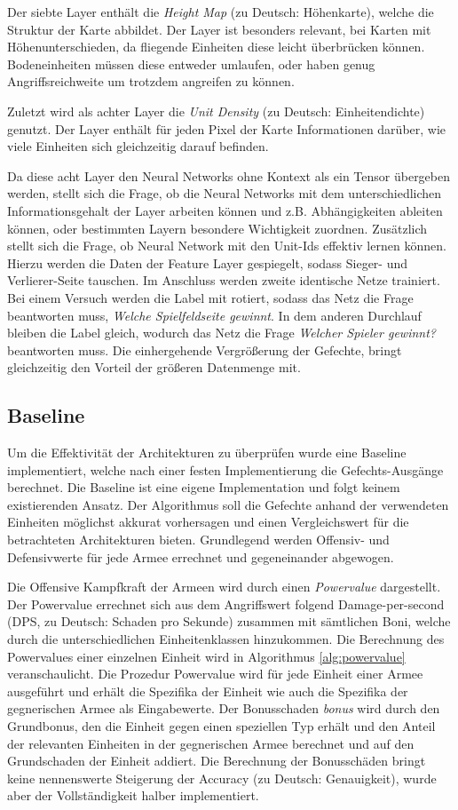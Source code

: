 Der siebte Layer enthält die \textit{Height Map} (zu Deutsch: Höhenkarte), welche die Struktur der Karte abbildet. Der Layer ist besonders relevant, bei Karten mit Höhenunterschieden, da fliegende Einheiten diese leicht überbrücken können. Bodeneinheiten müssen diese entweder umlaufen, oder haben genug Angriffsreichweite um trotzdem angreifen zu können. 

Zuletzt wird als achter Layer die \textit{Unit Density} (zu Deutsch: Einheitendichte) genutzt. Der Layer enthält für jeden Pixel der Karte Informationen darüber, wie viele Einheiten sich gleichzeitig darauf befinden. 

Da diese acht Layer den Neural Networks ohne Kontext als ein Tensor übergeben werden, stellt sich die Frage, ob die Neural Networks mit dem unterschiedlichen Informationsgehalt der Layer arbeiten können und z.B. Abhängigkeiten ableiten können, oder bestimmten Layern besondere Wichtigkeit zuordnen. Zusätzlich stellt sich die Frage, ob  Neural Network mit den Unit-Ids effektiv lernen können. Hierzu werden die Daten der Feature Layer gespiegelt, sodass Sieger- und Verlierer-Seite tauschen. Im Anschluss werden zweite identische Netze trainiert. Bei einem Versuch werden die Label mit rotiert, sodass das Netz die Frage beantworten muss, \textit{Welche Spielfeldseite gewinnt}. In dem anderen Durchlauf bleiben die Label gleich, wodurch das Netz die Frage \textit{Welcher Spieler gewinnt?} beantworten muss. Die einhergehende Vergrößerung der Gefechte, bringt gleichzeitig den Vorteil der größeren Datenmenge mit.


\subsection{Baseline}
Um die Effektivität der Architekturen zu überprüfen wurde eine Baseline implementiert, welche nach einer festen Implementierung die Gefechts-Ausgänge berechnet. Die Baseline ist eine eigene Implementation und folgt keinem existierenden Ansatz. Der Algorithmus soll die Gefechte anhand der verwendeten Einheiten möglichst akkurat vorhersagen und einen Vergleichswert für die betrachteten Architekturen bieten. Grundlegend werden Offensiv- und Defensivwerte für jede Armee errechnet und gegeneinander abgewogen.

Die Offensive Kampfkraft der Armeen wird durch einen \textit{Powervalue} dargestellt. Der Powervalue errechnet sich aus dem Angriffswert folgend Damage-per-second (DPS, zu Deutsch: Schaden pro Sekunde) zusammen mit sämtlichen Boni, welche durch die unterschiedlichen Einheitenklassen hinzukommen. Die Berechnung des Powervalues einer einzelnen Einheit wird in Algorithmus \ref{alg:powervalue} veranschaulicht. Die Prozedur Powervalue wird für jede Einheit einer Armee ausgeführt und erhält die Spezifika der Einheit wie auch die Spezifika der gegnerischen Armee als Eingabewerte. Der Bonusschaden \textit{bonus} wird durch den Grundbonus, den die Einheit gegen einen speziellen Typ erhält und den Anteil der relevanten Einheiten in der gegnerischen Armee berechnet und auf den Grundschaden der Einheit addiert. Die Berechnung der Bonusschäden bringt keine nennenswerte Steigerung der Accuracy (zu Deutsch: Genauigkeit), wurde aber der Vollständigkeit halber implementiert. 


